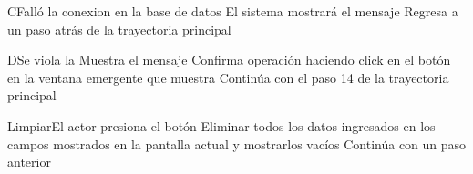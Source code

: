 
\begin{UCtrayectoriaA}{C}{Falló la conexion en la base de datos}
			\UCpaso[\UCsist] El sistema mostrará el mensaje 
			\UCpaso[\UCsist] Regresa a un paso atrás de la trayectoria principal 
\end{UCtrayectoriaA}


\begin{UCtrayectoriaA}{D}{Se viola la }
			\UCpaso[\UCsist] Muestra el mensaje  
			\UCpaso[\UCactor] Confirma operación haciendo click en el botón  en la ventana emergente que muestra
			\UCpaso[\UCsist] Continúa con el paso 14 de la trayectoria principal  
\end{UCtrayectoriaA}


\begin{UCtrayectoriaA}{Limpiar}{El actor presiona el botón }
			\UCpaso[\UCsist] Eliminar todos los datos ingresados en los campos mostrados en la pantalla actual y mostrarlos vacíos
			\UCpaso[\UCsist] Continúa con un paso anterior
\end{UCtrayectoriaA}